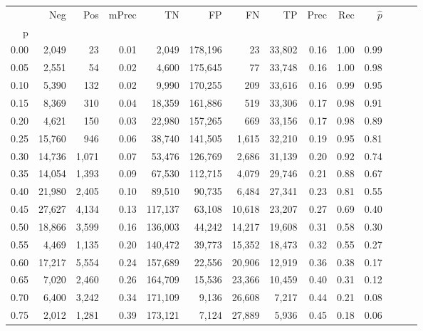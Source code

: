 \begin{tabular}{rrrrrrrrrrrrrr}
\toprule
{} &     Neg &    Pos & mPrec &       TN &       FP &      FN &      TP &  Prec &   Rec & $\hat{p}$ \\
p    &         &        &       &          &          &         &         &       &       &           \\
\midrule
0.00 &   2,049 &     23 &  0.01 &    2,049 &  178,196 &      23 &  33,802 &  0.16 &  1.00 &      0.99 \\
0.05 &   2,551 &     54 &  0.02 &    4,600 &  175,645 &      77 &  33,748 &  0.16 &  1.00 &      0.98 \\
0.10 &   5,390 &    132 &  0.02 &    9,990 &  170,255 &     209 &  33,616 &  0.16 &  0.99 &      0.95 \\
0.15 &   8,369 &    310 &  0.04 &   18,359 &  161,886 &     519 &  33,306 &  0.17 &  0.98 &      0.91 \\
0.20 &   4,621 &    150 &  0.03 &   22,980 &  157,265 &     669 &  33,156 &  0.17 &  0.98 &      0.89 \\
0.25 &  15,760 &    946 &  0.06 &   38,740 &  141,505 &   1,615 &  32,210 &  0.19 &  0.95 &      0.81 \\
0.30 &  14,736 &  1,071 &  0.07 &   53,476 &  126,769 &   2,686 &  31,139 &  0.20 &  0.92 &      0.74 \\
0.35 &  14,054 &  1,393 &  0.09 &   67,530 &  112,715 &   4,079 &  29,746 &  0.21 &  0.88 &      0.67 \\
0.40 &  21,980 &  2,405 &  0.10 &   89,510 &   90,735 &   6,484 &  27,341 &  0.23 &  0.81 &      0.55 \\
0.45 &  27,627 &  4,134 &  0.13 &  117,137 &   63,108 &  10,618 &  23,207 &  0.27 &  0.69 &      0.40 \\
0.50 &  18,866 &  3,599 &  0.16 &  136,003 &   44,242 &  14,217 &  19,608 &  0.31 &  0.58 &      0.30 \\
0.55 &   4,469 &  1,135 &  0.20 &  140,472 &   39,773 &  15,352 &  18,473 &  0.32 &  0.55 &      0.27 \\
0.60 &  17,217 &  5,554 &  0.24 &  157,689 &   22,556 &  20,906 &  12,919 &  0.36 &  0.38 &      0.17 \\
0.65 &   7,020 &  2,460 &  0.26 &  164,709 &   15,536 &  23,366 &  10,459 &  0.40 &  0.31 &      0.12 \\
0.70 &   6,400 &  3,242 &  0.34 &  171,109 &    9,136 &  26,608 &   7,217 &  0.44 &  0.21 &      0.08 \\
0.75 &   2,012 &  1,281 &  0.39 &  173,121 &    7,124 &  27,889 &   5,936 &  0.45 &  0.18 &      0.06 \\

\end{tabular}
